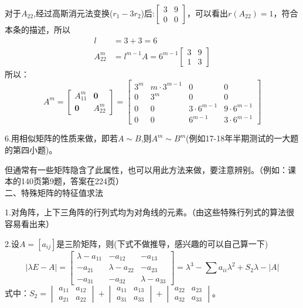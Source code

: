 \documentclass{article}
\begin{document}
\begin{jie}
对于$A_{22}$,经过高斯消元法变换($r_{1}-3r_{2}$)后:$
\begin{bmatrix}
  3 & 9 \\
  0 & 0
\end{bmatrix}
$，可以看出$r(A_{22})=1$，符合本条的描述，所以
\begin{align*}
 l&=3+3=6\\
 A_{22}^{m}&=l^{m-1}A=6^{m-1}
 \begin{bmatrix}
   3 & 9 \\
   1 & 3
 \end{bmatrix}
\end{align*}
所以：
\begin{equation*}
  A^{m}=
\begin{bmatrix}
  A_{11}^{m} & \mathbf{0} \\
  \mathbf{0} & A_{22}^{m}
\end{bmatrix}=
\begin{bmatrix}
  3^{m} & m\cdot3^{m-1}&0&0 \\
  0 & 3^{m}&0&0\\
  0&0&3\cdot6^{m-1}&9\cdot6^{m-1}\\
  0&0&6^{m-1}&3\cdot6^{m-1}
\end{bmatrix}
\end{equation*}
\end{jie}

6.用相似矩阵的性质来做，即若$A\sim B$,则$A^m\sim B^m$(例如17-18年半期测试的一大题的第四小题)。

但通常有一些矩阵隐含了此属性，也可以用此方法来做，要注意辨别。（例如：\textcolor[rgb]{1.00,0.00,0.00}{课本的140页第9题，答案在224页}）\\

二、特殊矩阵的特征值求法

1.对角阵，上下三角阵的行列式均为对角线的元素。（由这些特殊行列式的算法很容易看出来）

2.设$A=[a_{ij}]$是三阶矩阵，则(下式不做推导，感兴趣的可以自己算一下)
\begin{equation*}|\lambda E-A|=
  \begin{bmatrix}
    \lambda-a_{11} & -a_{12} &-a_{13} \\
-a_{21} & \lambda-a_{22} &-a_{23} \\
-a_{31} & -a_{32} &\lambda-a_{33}
  \end{bmatrix}=\lambda^{3}-\sum a_{ii}\lambda^2+S_{2}\lambda-|A|
\end{equation*}
式中：$S_{2}=
\begin{vmatrix}
  a_{11} & a_{12} \\
  a_{21} & a_{22}
\end{vmatrix}+\begin{vmatrix}
  a_{11} & a_{13} \\
  a_{31} & a_{33}
\end{vmatrix}+\begin{vmatrix}
  a_{22} & a_{23} \\
  a_{32} & a_{33}
\end{vmatrix}
$。
\end{document}
